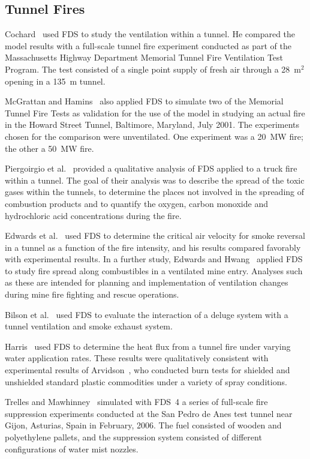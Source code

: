 \subsection{Tunnel Fires}

Cochard~\cite{Cochard:1} used FDS to study the ventilation within a tunnel. He compared the model results with a full-scale tunnel fire experiment conducted as part of the Massachusetts Highway Department Memorial Tunnel Fire Ventilation Test Program. The test consisted of a single point supply of fresh air through a 28~m$^2$ opening in a 135~m tunnel.

McGrattan and Hamins~\cite{McGrattan:HST} also applied FDS to simulate two of the Memorial Tunnel Fire Tests as validation for the use of the model in studying an actual fire in the Howard Street Tunnel, Baltimore, Maryland, July 2001. The experiments chosen for the comparison were unventilated. One experiment was a 20~MW fire; the other a 50~MW fire.

Piergoirgio et al.~\cite{Piergiorgio:1} provided a qualitative analysis of FDS applied to a truck fire within a tunnel. The goal of their analysis was to describe the spread of the toxic gases within the tunnels, to determine the places not involved in the spreading of combustion products and to quantify the oxygen, carbon monoxide and hydrochloric acid concentrations during the fire.

Edwards et al.~\cite{Edwards:SME2005,Edwards:FSJ} used FDS to determine the critical air velocity for smoke reversal in a tunnel as a function of the fire intensity, and his results compared favorably with  experimental results.  In a  further study,  Edwards and Hwang~\cite{Edwards:SME2006} applied FDS to study fire spread along combustibles in a ventilated mine entry. Analyses such as these are intended for planning and implementation of ventilation changes during mine fire fighting and rescue operations.

Bilson et al.~\cite{Bilson:2008} used FDS to evaluate the interaction of a deluge system with a tunnel ventilation and smoke exhaust system.

Harris~\cite{Harris:ISTSS2010} used FDS to determine the heat flux from a tunnel fire under varying water application rates. These results were qualitatively consistent with experimental results of Arvidson~\cite{Arvidson:ISTSS2010}, who conducted burn tests for shielded and unshielded standard plastic commodities under a variety of spray conditions.

Trelles and Mawhinney~\cite{Trelles:JFPE2010,Mawhinney:FT2012} simulated with FDS~4 a series of full-scale fire suppression experiments conducted at the San Pedro de Anes test tunnel near Gijon, Asturias, Spain in February, 2006. The fuel consisted of wooden and polyethylene pallets, and the suppression system consisted of different configurations of water mist nozzles.




